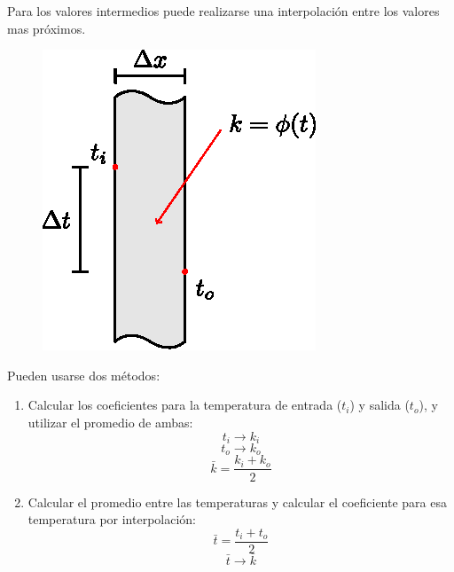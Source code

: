 Para los valores intermedios puede realizarse una interpolación entre los
valores mas próximos.

\begin{figure}[!h]
\centering
\includegraphics[scale=1.00]{figura02_18.eps}
\end{figure}

Pueden usarse dos métodos:

\begin{enumerate}
    \item Calcular los coeficientes para la temperatura de entrada ($t_i$) y
        salida ($t_o$), y utilizar el promedio de ambas:
        \begin{equation*}
            t_i\rightarrow k_i
        \end{equation*}
        \begin{equation*}
            t_o\rightarrow k_o
        \end{equation*}
        \begin{equation*}
            \bar{k}=\frac{k_i+k_o}{2}
        \end{equation*}

    \item Calcular el promedio entre las temperaturas y calcular el coeficiente
        para esa temperatura por interpolación:
        \begin{equation*}
            \bar{t}=\frac{t_i+t_o}{2}
        \end{equation*}
        \begin{equation*}
            \bar{t}\rightarrow \bar{k}
        \end{equation*}
\end{enumerate}

